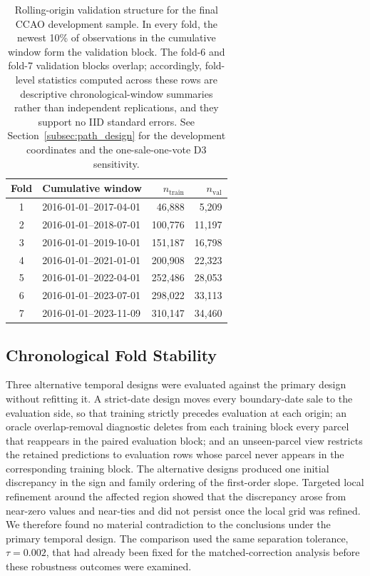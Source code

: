 \documentclass[10pt]{article}
\theoremstyle{definition}
\newcommand{\1}{\mathbf{1}}
\begin{document}
{\begin{table}[!ht]
\centering
\caption{Rolling-origin validation structure for the final CCAO development sample. In every fold, the newest 10\% of observations in the cumulative window form the validation block. The fold-6 and fold-7 validation blocks overlap; accordingly, fold-level statistics computed across these rows are descriptive chronological-window summaries rather than independent replications, and they support no IID standard errors. See Section~\ref{subsec:path_design} for the development coordinates and the one-sale-one-vote D3 sensitivity.}
\label{tab:fold_structure}
\begin{tabular}{clrr}
\toprule
Fold & Cumulative window & $n_{\mathrm{train}}$ & $n_{\mathrm{val}}$ \\
\midrule
1 & 2016-01-01--2017-04-01 & 46,888 & 5,209 \\
2 & 2016-01-01--2018-07-01 & 100,776 & 11,197 \\
3 & 2016-01-01--2019-10-01 & 151,187 & 16,798 \\
4 & 2016-01-01--2021-01-01 & 200,908 & 22,323 \\
5 & 2016-01-01--2022-04-01 & 252,486 & 28,053 \\
6 & 2016-01-01--2023-07-01 & 298,022 & 33,113 \\
7 & 2016-01-01--2023-11-09 & 310,147 & 34,460 \\
\bottomrule
\end{tabular}
\end{table}
}

\subsection{Chronological Fold Stability}

Three alternative temporal designs were evaluated against the primary design without
refitting it. A strict-date design moves every boundary-date sale to the evaluation
side, so that training strictly precedes evaluation at each origin; an oracle
overlap-removal diagnostic deletes from each training block every parcel that reappears
in the paired evaluation block; and an unseen-parcel view restricts the retained
predictions to evaluation rows whose parcel never appears in the corresponding training
block. The alternative designs produced one initial discrepancy in the sign and family
ordering of the first-order slope. Targeted local refinement around the affected region
showed that the discrepancy arose from near-zero values and near-ties and did not persist
once the local grid was refined. We therefore found no material contradiction to the
conclusions under the primary temporal design. The comparison used the same separation
tolerance, $\tau=0.002$, that had already been fixed for the matched-correction analysis
before these robustness outcomes were examined.
\end{document}
